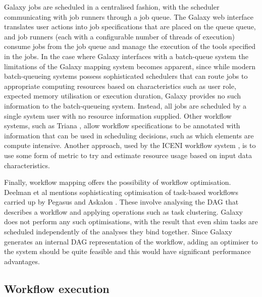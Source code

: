 \documentclass[a4paper,10pt]{scrreprt}
\begin{document}
Galaxy jobs are scheduled in a centralised fashion, with the scheduler communicating with job runners through a job queue. The Galaxy web interface translates user actions into job specifications that are placed on the queue queue, and job runners (each with a configurable number of threads of execution) consume jobs from the job queue and manage the execution of the tools specified in the jobs. In the case where Galaxy interfaces with a batch-queue system the limitations of the Galaxy mapping system becomes apparent, since while modern batch-queueing systems possess sophisticated schedulers that can route jobs to appropriate computing resources based on characteristics such as user role, expected memory utilisation or execution duration, Galaxy provides no such information to the batch-queueing system. Instead, all jobs are scheduled by a single system user with no resource information supplied. Other workflow systems, such as Triana \cite{churches_programming_2006}, allow workflow specifications to be 
annotated with information that can be used in scheduling decisions, such as which elements are compute intensive. Another approach, used by the ICENI workflow system \cite{mcgough_workflow_2004}, is to use some form of metric to try and estimate resource usage based on input data characteristics.

Finally, workflow mapping offers the possibility of workflow optimisation. Deelman et al mentions sophisticating optimisation of task-based workflows carried up by Pegasus \cite{deelman_pegasus:_2005} and Askalon \cite{fahringer_askalon:_2005}. These involve analysing the DAG that describes a workflow and applying operations such as task clustering. Galaxy does not perform any such optimisations, with the result that even shim tasks are scheduled independently of the analyses they bind together. Since Galaxy generates an internal DAG representation of the workflow, adding an optimiser to the system should be quite feasible and this would have significant performance advantages.

\subsection{Workflow execution}
\end{document}

